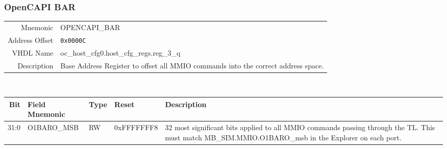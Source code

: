 \subsubsection{OpenCAPI BAR}
\begin{tabular}{ r | p{350px} }
  Mnemonic       & OPENCAPI\_BAR                            \\
  Address Offset & \texttt{0x0000C}                         \\
  VHDL Name      & oc\_host\_cfg0.host\_cfg\_regs.reg\_3\_q \\ \hline

  Description &
  Base Address Register to offset all MMIO commands into the correct address space. \\
\end{tabular}
\\
\begin{tabularx}{\textwidth}{r|l|l|l|X}
  \hline
  Bit  & Field Mnemonic & Type & Reset      & Description \\ \hline

  31:0 & O1BARO\_MSB    & RW   & 0xFFFFFFF8 &

  32 most significant bits applied to all MMIO commands passing
  through the TL. This must match MB\_SIM.MMIO.O1BARO\_msb in the
  Explorer on each port. \\
\end{tabularx}

